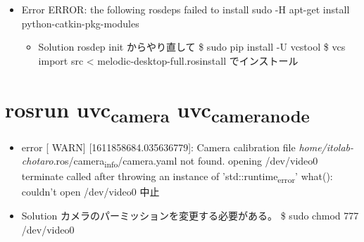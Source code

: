 \documentclass[11pt]{article}
\begin{document}
\begin{itemize}
\item Error
ERROR: the following rosdeps failed to install
 sudo -H apt-get install python-catkin-pkg-modules

\begin{itemize}
\item Solution
rosdep init からやり直して
\$ sudo pip install -U vcstool
\$ vcs import src < melodic-desktop-full.rosinstall
でインストール
\end{itemize}
\end{itemize}

\section{rosrun uvc\textsubscript{camera} uvc\textsubscript{camera}\textsubscript{node}}
\label{sec:orgfad3b17}
\begin{itemize}
\item error
[ WARN] [1611858684.035636779]: Camera calibration file \emph{home/itolab-chotaro}.ros/camera\textsubscript{info}/camera.yaml not found.
opening /dev/video0
terminate called after throwing an instance of 'std::runtime\textsubscript{error}'
  what():  couldn't open /dev/video0
中止

\item Solution
カメラのパーミッションを変更する必要がある。
\$ sudo chmod 777 /dev/video0
\end{itemize}
\end{document}
